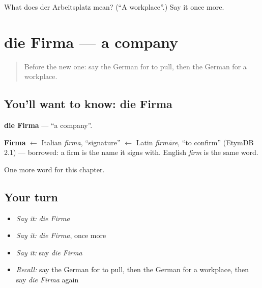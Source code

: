 \begin{tcolorbox}[breakable,colback=teal!4,colframe=teal!35!black,title={Before you move on}]
What does der Arbeitsplatz mean? (\textquotedblleft{}A workplace\textquotedblright{}.) Say it once more.
\end{tcolorbox}
\section[die Firma]{die Firma — a company}

\label{lesson:GE-C154-firma}



\begin{quote}
Before the new one: say the German for to pull, then the German for a workplace.
\end{quote}

\subsection*{You'll want to know: die Firma}
\textbf{die Firma} — \textquotedblleft{}a company\textquotedblright{}.

\begin{cousinweb}
\textbf{Firma} $\leftarrow$ Italian \emph{firma}, \textquotedblleft{}signature\textquotedblright{} $\leftarrow$ Latin \emph{firmāre}, \textquotedblleft{}to confirm\textquotedblright{} (EtymDB 2.1) — borrowed: a firm is the name it signs with. English \emph{firm} is the same word.
\end{cousinweb}

\begin{grammarlens}[title={What you've built}]
One more word for this chapter.
\end{grammarlens}

\subsection*{Your turn}
\begin{itemize}
\raggedright
  \item \emph{Say it:} \emph{die Firma}
  \item \emph{Say it:} \emph{die Firma}, once more
  \item \emph{Say it:} say \emph{die Firma}
  \item \emph{Recall:} say the German for to pull, then the German for a workplace, then say \emph{die Firma} again
\end{itemize}

